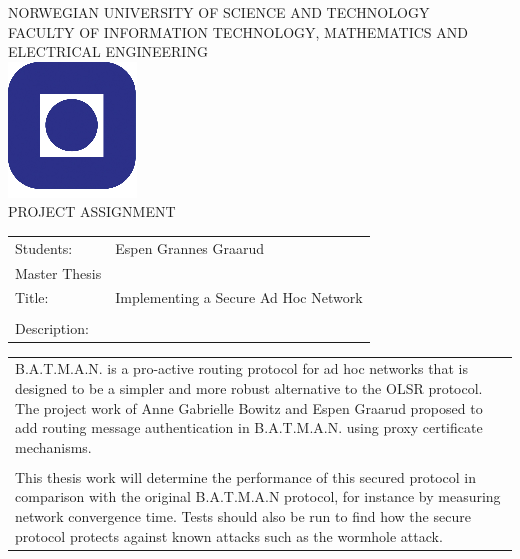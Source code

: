 
%
\setlength{\parindent}{0pt} 
\setlength{\parskip}{2ex}
\begin{titlepage}
\begin{center}
\textsc{NORWEGIAN UNIVERSITY OF SCIENCE AND TECHNOLOGY\\
FACULTY OF  INFORMATION TECHNOLOGY, MATHEMATICS AND ELECTRICAL ENGINEERING} \\
\vspace{0.5cm} 
\includegraphics[scale=0.5]{images/NTNU_logo.png} \\

\vspace{1.0cm}
{\Huge{PROJECT ASSIGNMENT}}
\vspace{1.0cm}

\begin{tabular}{ p{4cm} p{11cm}}

Students:	& Espen Grannes Graarud \\
Master Thesis \\
Title: & Implementing a Secure Ad Hoc Network \\\\
Description: & \\
\end{tabular}
{\small{\begin{tabular}{p{15cm}}
\vspace{0.2cm}
 
B.A.T.M.A.N. is a pro-active routing protocol for ad hoc networks that is
designed to be a simpler and more robust alternative to the OLSR protocol. The
project work of Anne Gabrielle Bowitz and Espen Graarud proposed to add routing
message authentication in B.A.T.M.A.N. using proxy certificate mechanisms.
\\\\
This thesis work will determine the performance of this secured protocol
in comparison with the original B.A.T.M.A.N protocol, for instance by
measuring network convergence time. Tests should also be run to find how the
secure protocol protects against known attacks such as the wormhole attack.



\end{tabular}}}
\end{center}
\end{titlepage}
